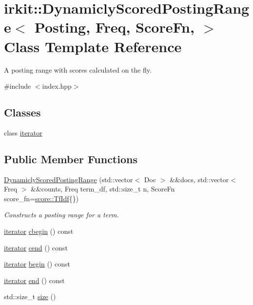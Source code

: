 \hypertarget{classirkit_1_1DynamiclyScoredPostingRange}{}\section{irkit\+:\+:Dynamicly\+Scored\+Posting\+Range$<$ Posting, Freq, Score\+Fn, $>$ Class Template Reference}
\label{classirkit_1_1DynamiclyScoredPostingRange}


A posting range with scores calculated on the fly.  




{\ttfamily \#include $<$index.\+hpp$>$}

\subsection*{Classes}
\begin{DoxyCompactItemize}
\item 
class \mbox{\hyperlink{classirkit_1_1DynamiclyScoredPostingRange_1_1iterator}{iterator}}
\end{DoxyCompactItemize}
\subsection*{Public Member Functions}
\begin{DoxyCompactItemize}
\item 
\mbox{\hyperlink{classirkit_1_1DynamiclyScoredPostingRange_a505ae46df58b541505dcc795df5e045d}{Dynamicly\+Scored\+Posting\+Range}} (std\+::vector$<$ Doc $>$ \&\&docs, std\+::vector$<$ Freq $>$ \&\&counts, Freq term\+\_\+df, std\+::size\+\_\+t n, Score\+Fn score\+\_\+fn=\mbox{\hyperlink{structirkit_1_1score_1_1TfIdf}{score\+::\+Tf\+Idf}}\{\})
\begin{DoxyCompactList}\small\item\em Constructs a posting range for a term. \end{DoxyCompactList}\item 
\mbox{\hyperlink{classirkit_1_1DynamiclyScoredPostingRange_1_1iterator}{iterator}} \mbox{\hyperlink{classirkit_1_1DynamiclyScoredPostingRange_a9fe9532cee4feaeefe305e8593f436b6}{cbegin}} () const
\item 
\mbox{\hyperlink{classirkit_1_1DynamiclyScoredPostingRange_1_1iterator}{iterator}} \mbox{\hyperlink{classirkit_1_1DynamiclyScoredPostingRange_a85219c57f0da94d00d1ed1c8f041d976}{cend}} () const
\item 
\mbox{\hyperlink{classirkit_1_1DynamiclyScoredPostingRange_1_1iterator}{iterator}} \mbox{\hyperlink{classirkit_1_1DynamiclyScoredPostingRange_a6a9d369c6e38b5a2b39cbbacb0dc5bed}{begin}} () const
\item 
\mbox{\hyperlink{classirkit_1_1DynamiclyScoredPostingRange_1_1iterator}{iterator}} \mbox{\hyperlink{classirkit_1_1DynamiclyScoredPostingRange_a6d0857abfae0edcf8a2c5d63916dfbb1}{end}} () const
\item 
std\+::size\+\_\+t \mbox{\hyperlink{classirkit_1_1DynamiclyScoredPostingRange_a3a080b946216c0caf02eb9749c8e2e2e}{size}} ()
\end{DoxyCompactItemize}


